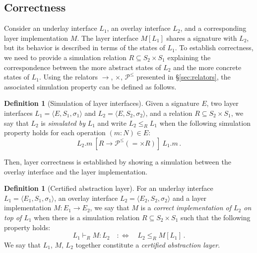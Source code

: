 \documentclass[11pt,oneside,draft]{book}
\theoremstyle{definition}
\newtheorem{definition}[theorem]{Definition}
\begin{document}

\subsection{Correctness} %

Consider an underlay interface $L_1$,
an overlay interface $L_2$,
and a corresponding layer implementation $M$.
The layer interface $M[L_1]$
shares a signature with $L_2$,
but its behavior is described in terms of
the states of $L_1$.
To establish correctness,
we need to provide a simulation relation
$R \subseteq S_2 \times S_1$
explaining the correspondence between
the more abstract states of $L_2$ and
the more concrete states of $L_1$.
Using the relators $\rightarrow$, $\times$, $\mathcal{P}^\le$
presented in \S\ref{sec:relators},
the associated simulation property can be defined as follows.

\begin{definition}[Simulation of layer interfaces] %
Given a signature $E$,
two layer interfaces
$L_1 = \langle E, S_1, \sigma_1 \rangle$ and
$L_2 = \langle E, S_2, \sigma_2 \rangle$,
and a relation $R \subseteq S_2 \times S_1$,
we say that $L_2$ is \emph{simulated by} $L_1$
and write $L_2 \le_R L_1$ when
the following simulation property holds
for each operation $(m : N) \in E$:
\begin{equation}
  \label{eqn:sim}
  L_2.m
  \: \mathrel{[R \rightarrow \mathcal{P}^\le({=} \times R)]} \:
  L_1.m \,.
\end{equation}
\end{definition}

Then, layer correctness is established by showing
a simulation between the overlay interface
and the layer implementation.

\begin{definition}[Certified abstraction layer] %
For an underlay interface $L_1 = \langle E_1, S_1, \sigma_1 \rangle$,
an overlay interface $L_2 = \langle E_2, S_2, \sigma_2 \rangle$ and
a layer implementation $M : E_1 \rightarrow E_2$,
we say that $M$ is a
\emph{correct implementation of $L_2$ on top of $L_1$}
when there is a simulation relation $R \subseteq S_2 \times S_1$
such that the following property holds:
\[
  L_1 \vdash_R M : L_2 \quad :\Leftrightarrow \quad
  L_2 \le_R M[L_1] \,.
\]
We say that $L_1$, $M$, $L_2$ together
constitute a \emph{certified abstraction layer}.
\end{definition}
\end{document}
